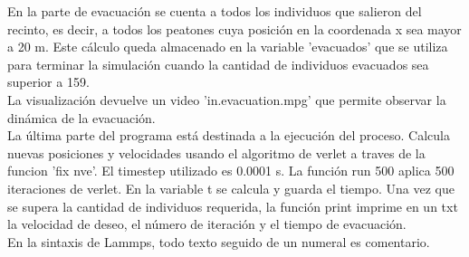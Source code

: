 En la parte de evacuación se cuenta a todos los individuos que salieron del recinto, es decir, a todos los peatones cuya posición en la coordenada x sea mayor a 20 m. Este cálculo queda almacenado en la variable 'evacuados' que se utiliza para terminar la simulación cuando la cantidad de individuos evacuados sea superior a 159. \\
La visualización devuelve un video 'in.evacuation.mpg' que permite observar la dinámica de la evacuación. \\
La última parte del programa está destinada a la ejecución del proceso. Calcula nuevas posiciones y velocidades usando el algoritmo de verlet a traves de la funcion 'fix nve'. El timestep utilizado es 0.0001 s. La función run 500 aplica 500 iteraciones de verlet. En la variable t se calcula y guarda el tiempo. Una vez que se supera la cantidad de individuos requerida, la función print imprime en un txt la velocidad de deseo, el número de iteración y el tiempo de evacuación.\\
En la sintaxis de Lammps, todo texto seguido de un numeral es comentario. 

